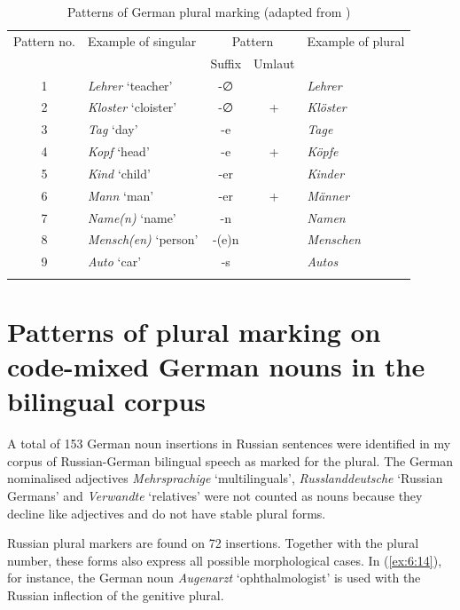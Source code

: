 \begin{table}
\begin{tabular}{c lccl}
 \lsptoprule
	Pattern no. & Example of singular & \multicolumn{2}{c}{Pattern} & Example of plural \\\cmidrule(lr){3-4}
	& & Suffix & Umlaut & \\\midrule
	1 & \textit{Lehrer} `teacher'	& -∅	& \textminus & \textit{Lehrer}\\
	2 & \textit{Kloster} `cloister' & -∅	& + & \textit{Klöster}\\
	3 & \textit{Tag} `day' & -e	& \textminus & \textit{Tage}\\
	4 & \textit{Kopf} `head' & -e	& + & \textit{Köpfe}\\
	5 & \textit{Kind} `child' & -er	& \textminus & \textit{Kinder}\\
	6 & \textit{Mann} `man' & -er	& + & \textit{Männer}\\
	7 & \textit{Name(n)} `name' & -n	& \textminus & \textit{Namen}\\
	8 & \textit{Mensch(en)} `person' & -(e)n	& \textminus & \textit{Menschen}\\
	9 & \textit{Auto} `car' & -s	& \textminus & \textit{Autos}\\
	\lspbottomrule
	\end{tabular}
	\caption{Patterns of German plural marking (adapted from \citealt[480]{flaemig})\label{tab:6:2}}
\end{table}

\section{Patterns of plural marking on code-mixed German nouns in the bilingual corpus}\label{sec:patterns corpus}

A total of 153 German noun insertions in Russian sentences were identified in my corpus of Russian-German bilingual speech as marked for the plural. The German nominalised adjectives \textit{Mehrsprachige} `multilinguals', \textit{Russlanddeutsche} `Russian Germans' and \textit{Verwandte} `relatives' were not counted as nouns because they decline like adjectives and do not have stable plural forms.

Russian plural markers are found on 72 insertions. Together with the plural number, these forms also express all possible morphological cases. In (\ref{ex:6:14}), for instance, the German noun \textit{Augenarzt} `ophthalmologist' is used with the Russian inflection of the genitive plural.

